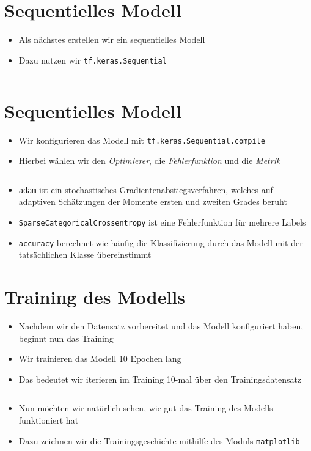 \documentclass[t]{beamer}
\newcommand\pycode[1]{\inputminted[frame=lines, framesep=2mm, fontsize=\normalsize]{python}{#1}}
\begin{document}
\section{Sequentielles Modell}
\begin{frame}
    \begin{itemize}
        \item Als nächstes erstellen wir ein sequentielles Modell
        \item Dazu nutzen wir \texttt{tf.keras.Sequential}
        \pycode{./code-snippets/sequential-model-no-aug.py}
    \end{itemize}
\end{frame}

\section{Sequentielles Modell}
\begin{frame}
    \begin{itemize}
        \item Wir konfigurieren das Modell mit \texttt{tf.keras.Sequential.compile}
        \item Hierbei wählen wir den \emph{Optimierer}, die \emph{Fehlerfunktion} und die \emph{Metrik}
        \pycode{./code-snippets/model-compile.py}
        \item \texttt{adam} ist ein stochastisches Gradientenabstiegsverfahren, welches auf adaptiven Schätzungen der Momente ersten und zweiten Grades beruht
        \item \texttt{SparseCategoricalCrossentropy} ist eine Fehlerfunktion für mehrere Labels
        \item \texttt{accuracy} berechnet wie häufig die Klassifizierung durch das Modell mit der tatsächlichen Klasse übereinstimmt
    \end{itemize}
\end{frame}

\section{Training des Modells}
\begin{frame}
    \begin{itemize}
        \item Nachdem wir den Datensatz vorbereitet und das Modell konfiguriert haben, beginnt nun das Training
        \newline
        \item Wir trainieren das Modell 10 Epochen lang
        \item Das bedeutet wir iterieren im Training 10-mal über den Trainingsdatensatz
        \pycode{./code-snippets/model-fit.py}
    \end{itemize}
    \begin{itemize}
        \item Nun möchten wir natürlich sehen, wie gut das Training des Modells funktioniert hat
        \item Dazu zeichnen wir die Trainingsgeschichte mithilfe des Moduls \texttt{matplotlib}
    \end{itemize}
\end{frame}
\end{document}
